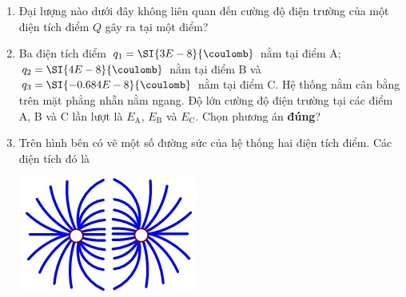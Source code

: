 \begin{enumerate}[label=\bfseries Câu \arabic*:]
\item Đại lượng nào dưới đây không liên quan đến cường độ điện trường của một điện tích điểm $Q$ gây ra tại một điểm?

\item Ba điện tích điểm $q_1=\SI{3E-8}{\coulomb}$ nằm tại điểm A; $q_2=\SI{4E-8}{\coulomb}$ nằm tại điểm B và $q_3=\SI{-0.684E-8}{\coulomb}$ nằm tại điểm C. Hệ thống nằm cân bằng trên mặt phẳng nhẵn nằm ngang. Độ lớn cường độ điện trường tại các điểm A, B và C lần lượt là $E_\text{A}$, $E_\text{B}$ và $E_\text{C}$. Chọn phương án \textbf{đúng}?

\item Trên hình bên có vẽ một số đường sức của hệ thống hai điện tích điểm. Các điện tích đó là
\begin{center}
	\includegraphics[width=0.3\linewidth]{../figs/PH11-MidSem2-02-3}
\end{center}


\end{enumerate}

